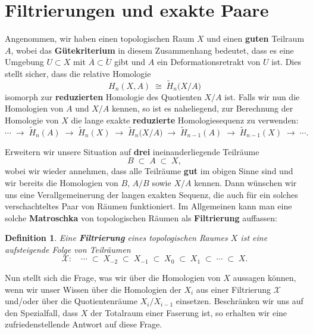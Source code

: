 \documentclass[12pt]{article}
\numberwithin{conj}{section}
\newtheorem{definition}[conj]{Definition}
\begin{document}
\section{Filtrierungen und exakte Paare}
Angenommen, wir haben einen topologischen Raum $X$ und einen \textbf{guten} Teilraum $A$, wobei das \textbf{Gütekriterium} in diesem Zusammenhang bedeutet, dass es eine Umgebung $U \subset X$ mit $\overline{A} \subset \mathring{U}$ gibt und $A$ ein Deformationsretrakt von $U$ ist. Dies stellt sicher, dass die relative Homologie
\[
    H_n(X,A) \;\cong\; \tilde{H}_n\bigl(X/A\bigr)
\]
isomorph zur \textbf{reduzierten} Homologie des Quotienten $X/A$ ist. Falls wir nun die Homologien von $A$ und $X/A$ kennen, so ist es naheliegend, zur Berechnung der Homologie von $X$ die lange exakte \textbf{reduzierte} Homologiesequenz zu verwenden:
\[
    \cdots \;\longrightarrow\; \tilde{H}_n(A)
    \;\longrightarrow\; \tilde{H}_n(X)
    \;\longrightarrow\; \tilde{H}_n\bigl(X/A\bigr)
    \;\longrightarrow\;
    \tilde{H}_{n-1}(A)
    \;\longrightarrow\;
    \tilde{H}_{n-1}(X)
    \;\longrightarrow\; \cdots.
\]

Erweitern wir unsere Situation auf \textbf{drei} ineinanderliegende Teilräume
\[
    B \;\subset\; A \;\subset\; X,
\]
wobei wir wieder annehmen, dass alle Teilräume \textbf{gut} im obigen Sinne sind und wir bereits die Homologien von $B$, $A/B$ sowie $X/A$ kennen. Dann wünschen wir uns eine Verallgemeinerung der langen exakten Sequenz, die auch für ein solches verschachteltes Paar von Räumen funktioniert. Im Allgemeinen kann man eine solche \textbf{Matroschka} von topologischen Räumen als \textbf{Filtrierung} auffassen:

\begin{definition}
    Eine \textbf{Filtrierung} eines topologischen Raumes $X$ ist eine aufsteigende Folge von Teilräumen
    \[
        \mathcal{X}:\quad
        \cdots \;\subset\; X_{-2} \;\subset\; X_{-1}
        \;\subset\; X_{0} \;\subset\; X_{1} \;\subset\; \cdots \;\subset\; X.
    \]
\end{definition}

Nun stellt sich die Frage, was wir über die Homologien von $X$ aussagen können, wenn wir unser Wissen über die Homologien der $X_i$ aus einer Filtrierung $\mathcal{X}$ und/oder über die Quotientenräume $X_i/X_{i-1}$ einsetzen. Beschränken wir uns auf den Spezialfall, dass $X$ der Totalraum einer Faserung ist, so erhalten wir eine zufriedenstellende Antwort auf diese Frage.
\end{document}
